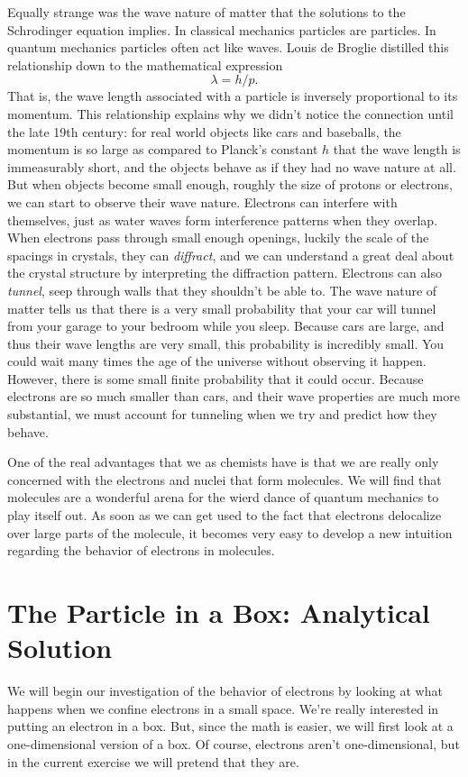 Equally strange was the wave nature of matter that the solutions to
the Schrodinger equation implies. In classical mechanics particles are
particles. In quantum mechanics particles often act like waves. Louis
de Broglie distilled this relationship down to the mathematical
expression
\begin{equation}
	\lambda = h/p.
\end{equation}
That is, the wave length associated with a particle is
inversely proportional to its momentum. This relationship explains why
we didn't notice the connection until the late 19th century: for real
world objects like cars and baseballs, the momentum is so large as
compared to Planck's constant $h$ that the wave length is immeasurably
short, and the objects behave as if they had no wave nature at
all. But when objects become small enough, roughly the size of protons
or electrons, we can start to observe their wave nature. Electrons can
interfere with themselves, just as water waves form interference
patterns when they overlap. When electrons pass through small enough
openings, luckily the scale of the spacings in crystals, they can
\emph{diffract}, and we can understand a great deal about the crystal
structure by interpreting the diffraction pattern. Electrons can also
\emph{tunnel}, seep through walls that they shouldn't be able to. The
wave nature of matter tells us that there is a very small probability
that your car will tunnel from your garage to your bedroom while you
sleep. Because cars are large, and thus their wave lengths are very
small, this probability is incredibly small. You could wait many times
the age of the universe without observing it happen. However, there is
some small finite probability that it could occur. Because electrons
are so much smaller than cars, and their wave properties are much more
substantial, we must account for tunneling when we try and predict how
they behave.

One of the real advantages that we as chemists have is that we are
really only concerned with the electrons and nuclei that form
molecules. We will find that molecules are a wonderful arena for the
wierd dance of quantum mechanics to play itself out. As soon as we can
get used to the fact that electrons delocalize over large parts of the
molecule, it becomes very easy to develop a new intuition regarding
the behavior of electrons in molecules.

\section{The Particle in a Box: Analytical Solution}
We will begin our investigation of the behavior of electrons by
looking at what happens when we confine electrons in a small space.
We're really interested in putting an electron in a box. But, since
the math is easier, we will first look at a one-dimensional version of
a box. Of course, electrons aren't one-dimensional, but in the current
exercise we will pretend that they are. 


